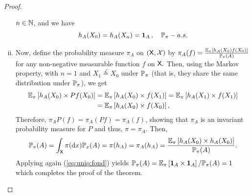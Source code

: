 \documentclass[english,graybox,envcountchap,envcountsame,sectrefs,shortlabels]{svmono}
\theoremstyle{style}
\newenvironment{svmultproof}{\small \begin{proof}}{\end{proof}}
\newcommand{\fracc}[2]{\frac{#1}{#2}}
\begin{document}
\begin{svmultproof}
\begin{enumerate}[(i)]
$n\in\mathbb{N}$, and we have
\begin{equation}
h_{A}(X_{0})=h_{A}(X_{n})=\mathbf{1}_{A}\,,\quad\mathbb{P}_{\pi}-a.s.\label{eq:uniq:fond}
\end{equation}
\item Now, define the probability measure $\pi_{A}$ on $(\mathsf{X},\mathcal{X})$
by $\pi_{A}(f)=\fracc{\PE_{\pi}\left[h_A(X_0)f(X_{0})\right]}{\PP_{\pi}(A)}$
for any non-negative measurable function $f$ on $\mathsf{X}.$ Then, using the Markov property,  with $n=1$ and $X_{1}\stackrel{\mathcal{L}}{=}X_{0}$
under $\mathbb{P}_{\pi}$ (that is, they share the same distribution under
$\mathbb{P}_{\pi}$), we get
\begin{align*}
\mathbb{E}_{\pi}\left[h_{A}(X_{0})\times Pf(X_{0})\right]&=\mathbb{E}_{\pi}\left[h_{A}(X_{0})\times f(X_{1})\right]=\mathbb{E}_{\pi}\left[h_{A}(X_{1})\times f(X_{1})\right]\\
 & =\mathbb{E}_{\pi}\left[h_{A}(X_{0})\times f(X_{0})\right],
\end{align*}
 Therefore, $\pi_{A}P(f)=\pi_{A}(Pf)=\pi_{A}(f)$, showing that $\pi_{A}$
is an invariant probability measure for $P$ and thus, $\pi=\pi_{A}$.
Then,
\[
\PP_{\pi}(A)=\int_{\Xset}\pi(\rmd x)\PP_{x}(A)=\pi(h_{A})=\pi_{A}(h_{A})=\fracc{\PE_{\pi}\left[h_A(X_0)\times h_{A}(X_{0})\right]}{\PP_{\pi}(A)}.
\]
Applying again (\ref{eq:uniq:fond}) yields $\mathbb{P}_{\pi}(A)=\mathbb{E}_{\pi}\left[\mathbf{1}_{A}\times\mathbf{1}_{A}\right]/\mathbb{P}_{\pi}(A)=1$
which completes the proof of the theorem.
\end{enumerate}
\end{svmultproof}
\end{document}
